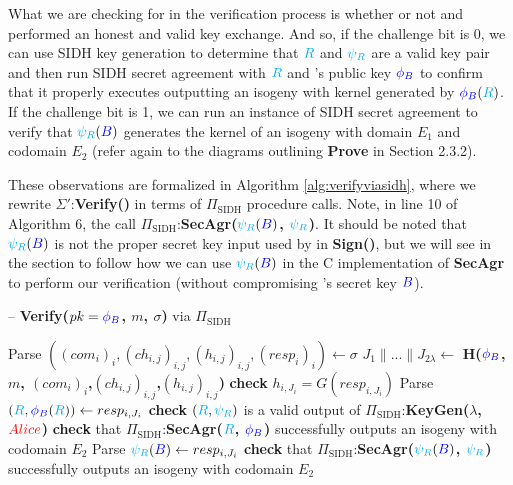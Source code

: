 \noindent
What we are checking for in the verification process is whether or not \bob and \randall performed an honest and valid key exchange. And so, if the challenge bit is 0, we can use SIDH key generation to determine that $\textcolor{cyan}{R}$ and $\textcolor{cyan}{\psi_R}$ are a valid key pair and then run SIDH secret agreement with $\textcolor{cyan}{R}$ and \bob's public key $\textcolor{blue}{\phi_B}$ to confirm that it properly executes outputting an isogeny with kernel generated by $\textcolor{blue}{\phi_B}(\textcolor{cyan}{R})$. If the challenge bit is 1, we can run an instance of SIDH secret agreement to verify that $\textcolor{cyan}{\psi_R}(\textcolor{blue}{B})$ generates the kernel of an isogeny with domain $E_{1}$ and codomain $E_{2}$ (refer again to the diagrams outlining \textbf{Prove} in Section 2.3.2).

These observations are formalized in Algorithm \ref{alg:verifyviasidh}, where we rewrite $\Sigma'$:\textbf{Verify()} in terms of $\Pi_{\text{SIDH}}$ procedure calls. Note, in line 10 of Algorithm 6, the call $\Pi_{\text{SIDH}}$:\textbf{SecAgr($\textcolor{cyan}{\psi_R}(\textcolor{blue}{B})$, $\textcolor{cyan}{\psi_R}$)}. It should be noted that $\textcolor{cyan}{\psi_R}(\textcolor{blue}{B})$ is not the proper secret key input used by \bob in \textbf{Sign()}, but we will see in the section to follow how we can use $\textcolor{cyan}{\psi_R}(\textcolor{blue}{B})$ in the C implementation of \textbf{SecAgr} to perform our verification (without compromising \bob's secret key $\textcolor{blue}{B}$).

\begin{algorithm}[H]
\caption{-- \textbf{Verify($pk = \textcolor{blue}{\phi_B}$, $m$, $\sigma$)} via $\Pi_{\text{SIDH}}$}
\label{alg:verifyviasidh}
\begin{algorithmic}[1]
\State Parse $((com_i)_i, (ch_{i,j})_{i,j}, (h_{i,j})_{i,j}, (resp_{i})_{i}) \gets \sigma$
\State $J_{1} \parallel ... \parallel J_{2\lambda} \gets$ \textbf{H($\textcolor{blue}{\phi_B}$, $m$, $(com_{i})_{i}$,$(ch_{i,j})_{i,j}$,$(h_{i,j})_{i,j}$)}
	\State \textbf{check} $h_{i,J_{i}} = G(resp_{i,J_{i}})$
		\State Parse $(\textcolor{cyan}{R},\textcolor{blue}{\phi_B}(\textcolor{cyan}{R})) \gets resp_{i,J_{i}}$
		\State \textbf{check} $(\textcolor{cyan}{R}, \textcolor{cyan}{\psi_R})$ is a valid output of $\Pi_{\text{SIDH}}$:\textbf{KeyGen($\lambda$, $\textcolor{red}{Alice}$)}
		\State \textbf{check} that $\Pi_{\text{SIDH}}$:\textbf{SecAgr($\textcolor{cyan}{R}$, $\textcolor{blue}{\phi_B}$)} successfully outputs an isogeny with codomain $E_{2}$
	\Else
		\State Parse $\textcolor{cyan}{\psi_R}(\textcolor{blue}{B}) \gets resp_{i,J_{i}}$
		\State \textbf{check} that $\Pi_{\text{SIDH}}$:\textbf{SecAgr($\textcolor{cyan}{\psi_R}(\textcolor{blue}{B})$, $\textcolor{cyan}{\psi_R}$)} successfully outputs an isogeny with codomain $E_{2}$
	\EndIf
\EndFor

	\State {}
\Else
	\State {}
\EndIf
\end{algorithmic}
\end{algorithm}

